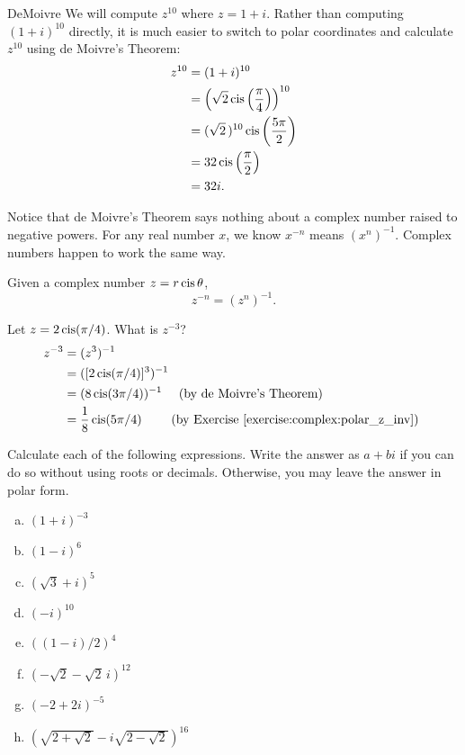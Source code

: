 \begin{example}{DeMoivre} We will compute $z^{10}$ where $z=1+i$. Rather than computing $(1+i)^{10}$ directly, it
is much easier to switch to polar coordinates and calculate $z^{10}$
using de Moivre's Theorem: \begin{align*}
z^{10} & =(1+i)^{10}\\
 & =\left(\sqrt{2}\operatorname{cis}\left(\frac{\pi}{4}\right)\right)^{10}\\
 & =(\sqrt{2}\,)^{10}\operatorname{cis}\left(\frac{5\pi}{2}\right)\\
 & =32\operatorname{cis}\left(\frac{\pi}{2}\right)\\
 & =32i.\end{align*}
 \end{example}
 
\noindent
Notice that de Moivre's Theorem says nothing about a complex number raised to negative powers.  For any real number $x$, we know $x^{-n}$ means $(x^n)^{-1}$.  Complex numbers happen to work the same way.
 
 \begin{defn} \label{polar_negpower}
 Given a complex number $z=r\operatorname{cis}\theta$, 
 \[ z^{-n} = (z^n)^{-1}. \]
 \end{defn}
 
 \begin{example}{5}
Let $z = 2\operatorname{cis}(\pi/4)$.  What is $z^{-3}$?  
 \begin{align*}
  z^{-3} & = (z^3)^{-1} \\
  & = ([2\cis(\pi/4)]^3)^{-1} \\
  & = (8\cis(3\pi/4))^{-1} \quad \mbox{ (by de Moivre's Theorem) } \\
  & = \frac{1}{8}\cis(5\pi/4) \qquad \mbox{ (by Exercise~\ref{exercise:complex:polar_z_inv}) } 
  \end{align*}
  \end{example}
 
 

\begin{exercise}{31}
Calculate each of the following expressions. Write the answer as $a + bi$ if you can do so without using roots or decimals. Otherwise, you may leave the answer in polar form.
\begin{multicols}{2}
\begin{enumerate}[(a)]
 
 \item
$(1+i)^{-3}$
 \item
$(1 - i)^{6}$
 \item
$(\sqrt{3}+i)^{5}$
 \item
$(-i)^{10}$
 \item
$((1-i)/2)^{4}$
 \item
$(-\sqrt{2} - \sqrt{2}\, i)^{12}$
 \item
$(-2+2i)^{-5}$
\item
$(\sqrt{2 + \sqrt{2}} - i\sqrt{2 - \sqrt{2}})^{16}$
\end{enumerate}
\end{multicols}
\end{exercise}


